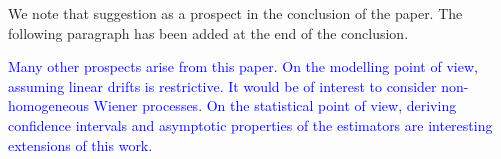 We note that suggestion as a prospect in the conclusion of the paper. The following paragraph has been added at the end of the conclusion. 

\textcolor{blue}{Many other prospects arise from this paper. On the modelling point of view, assuming linear drifts is restrictive. It would be of interest to consider non-homogeneous Wiener processes. On the statistical point of view, deriving confidence intervals and asymptotic properties of the estimators are interesting extensions of this work.}\\












%



